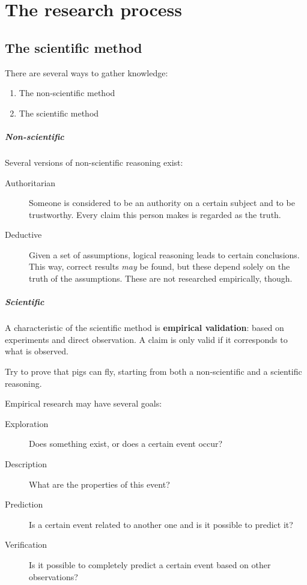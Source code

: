 \chapter{The research process}
\section{The scientific method}

There are several ways to gather knowledge:

\begin{enumerate}
	\item The non-scientific method
	\item The scientific method
\end{enumerate}

\paragraph{Non-scientific} Several versions of non-scientific reasoning exist:
\begin{description}
	\item [Authoritarian] Someone is considered to be an authority on a certain subject and to be trustworthy. Every claim this person makes is regarded as the truth.
	\item [Deductive] Given a set of assumptions, logical reasoning leads to certain conclusions. This way, correct results \emph{may} be found, but these depend solely on the truth of the assumptions. These are not researched empirically, though.
\end{description}

\paragraph{Scientific} A characteristic of the scientific method is \textbf{empirical validation}: based on experiments and direct observation. A claim is only valid if it corresponds to what is observed.

\begin{exercise}
Try to prove that pigs can fly, starting from both a non-scientific and a scientific reasoning.
\end{exercise}

Empirical research may have several goals:

\begin{description}
    \item[Exploration] Does something exist, or does a certain event occur?
    \item[Description] What are the properties of this event?
    \item[Prediction] Is a certain event related to another one and is it possible to predict it?
    \item[Verification] Is it possible to completely predict a certain event based on other observations?
\end{description}

